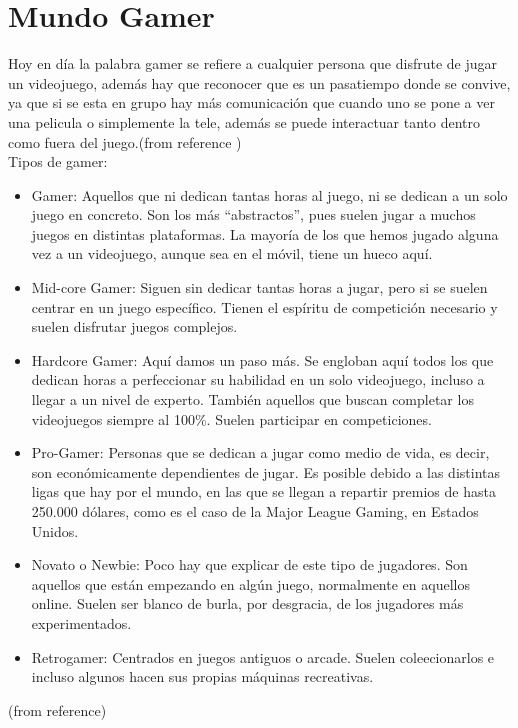 \documentclass{bmcart}
\begin{document}
\section*{Mundo Gamer}
Hoy en día la palabra gamer se refiere a cualquier persona que disfrute de jugar un videojuego, además hay que reconocer que es un pasatiempo donde se convive, ya que si se esta en grupo hay más comunicación que cuando uno se pone a ver una pelicula o simplemente la tele, además se puede interactuar tanto dentro como fuera del juego.(from reference \cite{marti1994videojuegos})\\
Tipos de gamer:
\begin{itemize} 
	\item Gamer: Aquellos que ni dedican tantas horas al juego, ni se dedican a un solo juego en concreto. Son los más “abstractos”, pues suelen jugar a muchos juegos en distintas plataformas. La mayoría de los que hemos jugado alguna vez a un videojuego, aunque sea en el móvil, tiene un hueco aquí.
	\item Mid-core Gamer: Siguen sin dedicar tantas horas a jugar, pero si se suelen centrar en un juego específico. Tienen el espíritu de competición necesario y suelen disfrutar juegos complejos.
	\item Hardcore Gamer: Aquí damos un paso más. Se engloban aquí todos los que dedican horas a perfeccionar su habilidad en un solo videojuego, incluso a llegar a un nivel de experto. También aquellos que buscan completar los videojuegos siempre al 100{\%}. Suelen participar en competiciones.
	\item Pro-Gamer: Personas que se dedican a jugar como medio de vida, es decir, son económicamente dependientes de jugar. Es posible debido a las distintas ligas que hay por el mundo, en las que se llegan a repartir premios de hasta 250.000 dólares, como es el caso de la Major League Gaming, en Estados Unidos.
	\item Novato o Newbie: Poco hay que explicar de este tipo de jugadores. Son aquellos que están empezando en algún juego, normalmente en aquellos online. Suelen ser blanco de burla, por desgracia, de los jugadores más experimentados.
	\item Retrogamer: Centrados en juegos antiguos o arcade. Suelen coleecionarlos e incluso algunos hacen sus propias máquinas recreativas.
\end{itemize} (from reference\cite{tiposgamer})
\end{document}
